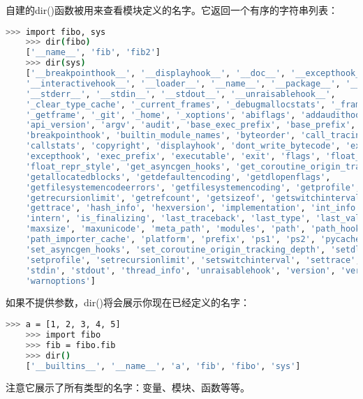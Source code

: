 \documentclass[../modules.tex]{subfiles}
\begin{document}
自建的dir()函数被用来查看模块定义的名字。它返回一个有序的字符串列表：
\begin{lstlisting}[language=bash]
    >>> import fibo, sys
    >>> dir(fibo)
    ['__name__', 'fib', 'fib2']
    >>> dir(sys)  
    ['__breakpointhook__', '__displayhook__', '__doc__', '__excepthook__',
    '__interactivehook__', '__loader__', '__name__', '__package__', '__spec__',
    '__stderr__', '__stdin__', '__stdout__', '__unraisablehook__',
    '_clear_type_cache', '_current_frames', '_debugmallocstats', '_framework',
    '_getframe', '_git', '_home', '_xoptions', 'abiflags', 'addaudithook',
    'api_version', 'argv', 'audit', 'base_exec_prefix', 'base_prefix',
    'breakpointhook', 'builtin_module_names', 'byteorder', 'call_tracing',
    'callstats', 'copyright', 'displayhook', 'dont_write_bytecode', 'exc_info',
    'excepthook', 'exec_prefix', 'executable', 'exit', 'flags', 'float_info',
    'float_repr_style', 'get_asyncgen_hooks', 'get_coroutine_origin_tracking_depth',
    'getallocatedblocks', 'getdefaultencoding', 'getdlopenflags',
    'getfilesystemencodeerrors', 'getfilesystemencoding', 'getprofile',
    'getrecursionlimit', 'getrefcount', 'getsizeof', 'getswitchinterval',
    'gettrace', 'hash_info', 'hexversion', 'implementation', 'int_info',
    'intern', 'is_finalizing', 'last_traceback', 'last_type', 'last_value',
    'maxsize', 'maxunicode', 'meta_path', 'modules', 'path', 'path_hooks',
    'path_importer_cache', 'platform', 'prefix', 'ps1', 'ps2', 'pycache_prefix',
    'set_asyncgen_hooks', 'set_coroutine_origin_tracking_depth', 'setdlopenflags',
    'setprofile', 'setrecursionlimit', 'setswitchinterval', 'settrace', 'stderr',
    'stdin', 'stdout', 'thread_info', 'unraisablehook', 'version', 'version_info',
    'warnoptions']
\end{lstlisting}
如果不提供参数，dir()将会展示你现在已经定义的名字：
\begin{lstlisting}[language=bash]
    >>> a = [1, 2, 3, 4, 5]
    >>> import fibo
    >>> fib = fibo.fib
    >>> dir()
    ['__builtins__', '__name__', 'a', 'fib', 'fibo', 'sys']
\end{lstlisting}
注意它展示了所有类型的名字：变量、模块、函数等等。
\end{document}

